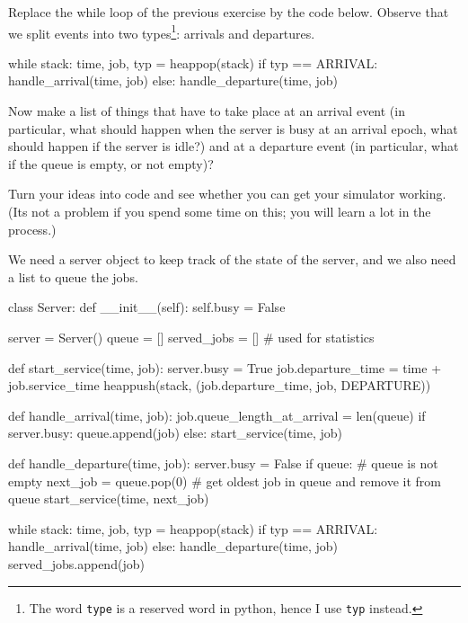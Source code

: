 \documentclass{scrartcl}
\begin{document}
\begin{exercise}
  Replace the while loop of the previous exercise by the code below. Observe that we split events into two types\footnote{The word \texttt{type} is a reserved word in python, hence I use \texttt{typ} instead.}: arrivals and departures. 

  \begin{pyblock}
while stack:
    time, job, typ = heappop(stack)
    if typ == ARRIVAL:
        handle_arrival(time, job)
    else:
        handle_departure(time, job)
    
  \end{pyblock}

Now make a list of things that have to take place at an arrival event (in particular, what should happen when the server is busy at an arrival epoch, what should happen if the server is idle?) and at a departure event (in particular, what if the queue is empty, or not empty)? 

Turn your ideas into code and see whether you can get your simulator working. (Its not a problem if you spend some time on this; you will learn a lot in the process.)

\begin{solution}
We need a server object to keep track of the state of the server, and we also need  a list to queue the jobs. 

  \begin{pyblock}
class Server:
    def __init__(self):
        self.busy = False

server = Server()
queue = []
served_jobs = [] # used for statistics

def start_service(time, job):
    server.busy = True
    job.departure_time = time + job.service_time
    heappush(stack, (job.departure_time, job, DEPARTURE))

def handle_arrival(time, job):
    job.queue_length_at_arrival = len(queue)
    if server.busy:
        queue.append(job)
    else:
        start_service(time, job)
        
def handle_departure(time, job):
    server.busy = False
    if queue: # queue is not empty
        next_job = queue.pop(0) # get oldest job in queue and remove it from queue
        start_service(time, next_job)
        
while stack:
    time, job, typ = heappop(stack)
    if typ == ARRIVAL:
        handle_arrival(time, job)
    else:
        handle_departure(time, job)
        served_jobs.append(job)

  \end{pyblock}
\end{solution}

\end{exercise}
\end{document}
